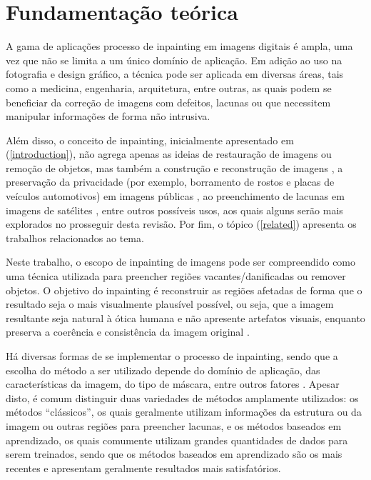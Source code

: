 
\section{Fundamentação teórica}

A gama de aplicações processo de inpainting em imagens digitais é ampla, uma vez que não se limita a um único domínio de aplicação. Em adição ao uso na fotografia e design gráfico, a técnica pode ser aplicada em diversas áreas, tais como a medicina, engenharia, arquitetura, entre outras, as quais podem se beneficiar da correção de imagens com defeitos, lacunas ou que necessitem manipular informações de forma não intrusiva.

Além disso, o conceito de inpainting, inicialmente apresentado em (\ref{introduction}), não agrega apenas as ideias de restauração de imagens ou remoção de objetos, mas também a construção e reconstrução de imagens \cite{you2019pirec}, a preservação da privacidade (por exemplo, borramento de rostos e placas de veículos automotivos) em imagens públicas \cite{google2022magritte}, ao preenchimento de lacunas em imagens de satélites \cite{Maalouf2009bandelet}, entre outros possíveis usos, aos quais alguns serão mais explorados no prosseguir desta revisão. Por fim, o tópico (\ref{related}) apresenta os trabalhos relacionados ao tema. 

Neste trabalho, o escopo de inpainting de imagens pode ser compreendido como uma técnica utilizada para preencher regiões vacantes/danificadas ou remover objetos. O objetivo do inpainting é reconstruir as regiões afetadas de forma que o resultado seja o mais visualmente plausível possível, ou seja, que a imagem resultante seja natural à ótica humana e não apresente artefatos visuais, enquanto preserva a coerência e consistência da imagem original \cite{levin2003learning}.

Há diversas formas de se implementar o processo de inpainting, sendo que a escolha do método a ser utilizado depende do domínio de aplicação, das características da imagem, do tipo de máscara, entre outros fatores \cite{black2020evaluation}.
Apesar disto, é comum distinguir duas variedades de métodos amplamente utilizados: os métodos ``clássicos'', os quais geralmente utilizam informações da estrutura ou da imagem ou outras regiões para preencher lacunas, e os métodos baseados em aprendizado, os quais comumente utilizam grandes quantidades de dados para serem treinados, sendo que os métodos baseados em aprendizado são os mais recentes e apresentam geralmente resultados mais satisfatórios.

